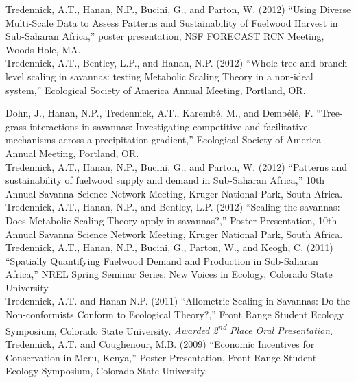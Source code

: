 \documentclass[margin,line]{resume}
\begin{document}
\begin{resume}
    Tredennick, A.T., Hanan, N.P., Bucini, G., and Parton, W. (2012) ``Using Diverse Multi-Scale Data to Assess Patterns and Sustainability of Fuelwood Harvest in Sub-Saharan Africa,'' poster presentation, NSF FORECAST RCN Meeting, Woods Hole, MA. \vspace{-6mm}\\%
    
    Tredennick, A.T., Bentley, L.P., and Hanan, N.P. (2012) ``Whole-tree and branch-level scaling in savannas: testing Metabolic Scaling Theory in a non-ideal system,'' Ecological Society of America Annual Meeting, Portland, OR. \vspace{-6mm}\\%
    
    \newpage{}
    
    Dohn, J., Hanan, N.P., Tredennick, A.T., Karemb\'{e}, M., and Demb\'{e}l\'{e}, F. ``Tree-grass interactions in savannas: Investigating competitive and facilitative mechanisms across a precipitation gradient,'' Ecological Society of America Annual Meeting, Portland, OR. \vspace{-6mm}\\%
    
    Tredennick, A.T., Hanan, N.P., Bucini, G., and Parton, W. (2012) ``Patterns and sustainability of fuelwood supply and demand in Sub-Saharan Africa,'' 10th Annual Savanna Science Network Meeting, Kruger National Park, South Africa.\vspace{-6mm}\\%
    
    Tredennick, A.T., Hanan, N.P., and Bentley, L.P. (2012) ``Scaling the savannas: Does Metabolic Scaling Theory apply in savannas?,'' Poster Presentation, 10th Annual Savanna Science Network Meeting, Kruger National Park, South Africa. \vspace{-6mm}\\%

    Tredennick, A.T., Hanan, N.P., Bucini, G., Parton, W., and Keogh, C. (2011) ``Spatially Quantifying Fuelwood Demand and Production in Sub-Saharan Africa,'' NREL Spring Seminar Series: New Voices in Ecology, Colorado State University.\vspace{-6mm}\\%
    
    Tredennick, A.T. and Hanan N.P. (2011) ``Allometric Scaling in Savannas: Do the Non-conformists Conform to Ecological Theory?,'' Front Range Student Ecology Symposium, Colorado State University. \textsl{Awarded 2\textsuperscript{nd} Place Oral Presentation}.\vspace{-6mm}\\%
  
  Tredennick, A.T. and Coughenour, M.B. (2009) ``Economic Incentives for Conservation in Meru, Kenya,'' Poster Presentation, Front Range Student Ecology Symposium, Colorado State University.

\end{resume}
\end{document}
